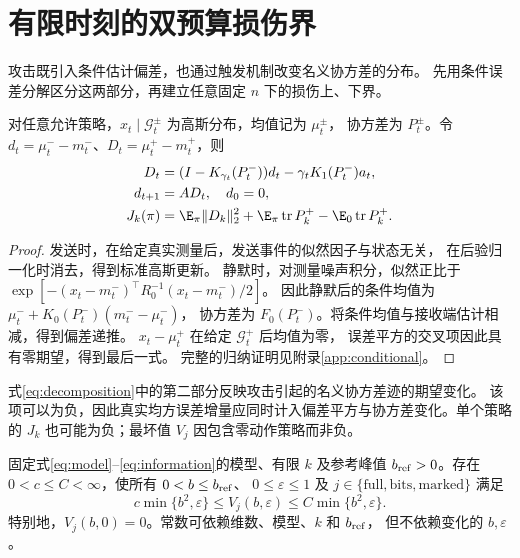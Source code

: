 \section{有限时刻的双预算损伤界}
\label{sec:bounds}
攻击既引入条件估计偏差，也通过触发机制改变名义协方差的分布。
先用条件误差分解区分这两部分，再建立任意固定 $n$ 下的损伤上、下界。
\begin{lemma}[条件误差分解]
\label{lem:gaussian}
对任意允许策略，$x_t\mid\mathcal G_t^\pm$ 为高斯分布，均值记为 $\mu_t^\pm$，
协方差为 $P_t^\pm$。令 $d_t=\mu_t^--m_t^-$、$D_t=\mu_t^+-m_t^+$，则
\begin{equation}
 \begin{aligned}
 D_t&=(I-K_{\gamma_t}(P_t^-))d_t-\gamma_t K_1(P_t^-)a_t,\\
 d_{t+1}&=AD_t,\quad d_0=0,\\
 J_k(\pi)&=\E_\pi\|D_k\|_2^2+
 \E_\pi\operatorname{tr}P_k^+-\E_0\operatorname{tr}P_k^+.
 \end{aligned}
 \label{eq:decomposition}
\end{equation}
\end{lemma}
\begin{proof}
发送时，在给定真实测量后，发送事件的似然因子与状态无关，
在后验归一化时消去，得到标准高斯更新。
静默时，对测量噪声积分，似然正比于
$\exp[-(x_t-m_t^-)^\top R_0^{-1}(x_t-m_t^-)/2]$。
因此静默后的条件均值为 $\mu_t^-+K_0(P_t^-)(m_t^--\mu_t^-)$，
协方差为 $F_0(P_t^-)$。将条件均值与接收端估计相减，得到偏差递推。
$x_t-\mu_t^+$ 在给定 $\mathcal G_t^+$ 后均值为零，
误差平方的交叉项因此具有零期望，得到最后一式。
完整的归纳证明见附录\ref{app:conditional}。
\end{proof}

式\eqref{eq:decomposition}中的第二部分反映攻击引起的名义协方差迹的期望变化。
该项可以为负，因此真实均方误差增量应同时计入偏差平方与协方差变化。单个策略的 $J_k$ 也可能为负；最坏值 $V_j$ 因包含零动作策略而非负。

\begin{theorem}[任意固定维数下的可达到损伤阶数]
\label{thm:main}
固定式\eqref{eq:model}--\eqref{eq:information}的模型、有限 $k$ 及参考峰值
$b_{\rm ref}>0$。存在 $0<c\le C<\infty$，使所有 $0<b\le b_{\rm ref}$、
$0\le\varepsilon\le1$ 及 $j\in\{\mathrm{full},\mathrm{bits},\mathrm{marked}\}$ 满足
\begin{equation}
 c\min\{b^2,\varepsilon\}\le V_j(b,\varepsilon)
 \le C\min\{b^2,\varepsilon\}.
 \label{eq:main}
\end{equation}
特别地，$V_j(b,0)=0$。常数可依赖维数、模型、$k$ 和 $b_{\rm ref}$，
但不依赖变化的 $b,\varepsilon$。
\end{theorem}

